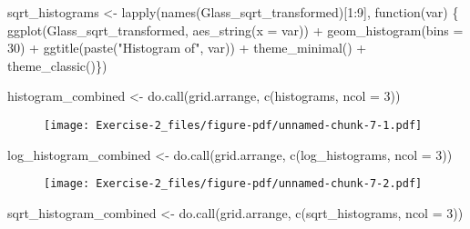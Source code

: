 \documentclass[
  letterpaper,
  DIV=11,
  numbers=noendperiod]{scrartcl}
\newenvironment{Shaded}{\begin{snugshade}}{\end{snugshade}}
\newcommand{\AttributeTok}[1]{\textcolor[rgb]{0.40,0.45,0.13}{#1}}
\newcommand{\ControlFlowTok}[1]{\textcolor[rgb]{0.00,0.23,0.31}{#1}}
\newcommand{\DecValTok}[1]{\textcolor[rgb]{0.68,0.00,0.00}{#1}}
\newcommand{\FunctionTok}[1]{\textcolor[rgb]{0.28,0.35,0.67}{#1}}
\newcommand{\NormalTok}[1]{\textcolor[rgb]{0.00,0.23,0.31}{#1}}
\newcommand{\OtherTok}[1]{\textcolor[rgb]{0.00,0.23,0.31}{#1}}
\newcommand{\SpecialCharTok}[1]{\textcolor[rgb]{0.37,0.37,0.37}{#1}}
\newcommand{\StringTok}[1]{\textcolor[rgb]{0.13,0.47,0.30}{#1}}
\begin{document}
\begin{Shaded}
\begin{Highlighting}[]
\NormalTok{sqrt\_histograms }\OtherTok{\textless{}{-}} \FunctionTok{lapply}\NormalTok{(}\FunctionTok{names}\NormalTok{(Glass\_sqrt\_transformed)[}\DecValTok{1}\SpecialCharTok{:}\DecValTok{9}\NormalTok{], }\ControlFlowTok{function}\NormalTok{(var) \{}
  \FunctionTok{ggplot}\NormalTok{(Glass\_sqrt\_transformed, }\FunctionTok{aes\_string}\NormalTok{(}\AttributeTok{x =}\NormalTok{ var)) }\SpecialCharTok{+} 
    \FunctionTok{geom\_histogram}\NormalTok{(}\AttributeTok{bins =} \DecValTok{30}\NormalTok{) }\SpecialCharTok{+} 
    \FunctionTok{ggtitle}\NormalTok{(}\FunctionTok{paste}\NormalTok{(}\StringTok{"Histogram of"}\NormalTok{, var)) }\SpecialCharTok{+} 
    \FunctionTok{theme\_minimal}\NormalTok{() }\SpecialCharTok{+}
    \FunctionTok{theme\_classic}\NormalTok{()\})}

\NormalTok{histogram\_combined }\OtherTok{\textless{}{-}} \FunctionTok{do.call}\NormalTok{(grid.arrange, }\FunctionTok{c}\NormalTok{(histograms, }\AttributeTok{ncol =} \DecValTok{3}\NormalTok{))}
\end{Highlighting}
\end{Shaded}

\begin{figure}[H]

{\centering \texttt{[image: Exercise-2\_files/figure-pdf/unnamed-chunk-7-1.pdf]}

}

\end{figure}

\begin{Shaded}
\begin{Highlighting}[]
\NormalTok{log\_histogram\_combined }\OtherTok{\textless{}{-}} \FunctionTok{do.call}\NormalTok{(grid.arrange, }\FunctionTok{c}\NormalTok{(log\_histograms, }\AttributeTok{ncol =} \DecValTok{3}\NormalTok{))}
\end{Highlighting}
\end{Shaded}

\begin{figure}[H]

{\centering \texttt{[image: Exercise-2\_files/figure-pdf/unnamed-chunk-7-2.pdf]}

}

\end{figure}

\begin{Shaded}
\begin{Highlighting}[]
\NormalTok{sqrt\_histogram\_combined }\OtherTok{\textless{}{-}} \FunctionTok{do.call}\NormalTok{(grid.arrange, }\FunctionTok{c}\NormalTok{(sqrt\_histograms, }\AttributeTok{ncol =} \DecValTok{3}\NormalTok{))}
\end{Highlighting}
\end{Shaded}
\end{document}
